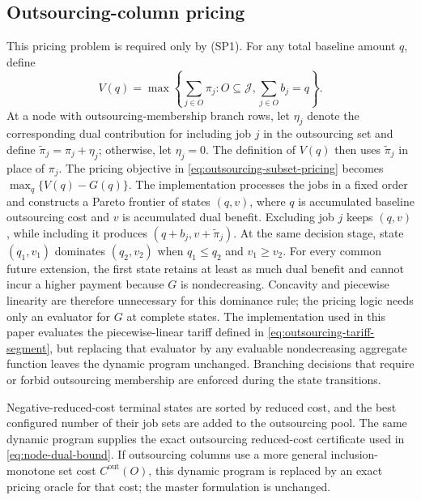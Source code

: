 \subsection{Outsourcing-column pricing}
\label{subsec:outsourcing-pricing}

This pricing problem is required only by \textup{(SP1)}. For any total
baseline amount $q$, define
\begin{equation}
    V(q)=
    \max\left\{
        \sum_{j\in O}\pi_j:
        O\subseteq\mathcal J,
        \sum_{j\in O}b_j=q
    \right\}.
\end{equation}
At a node with outsourcing-membership branch rows, let $\eta_j$ denote the
corresponding dual contribution for including job $j$ in the outsourcing set and
define $\widetilde\pi_j=\pi_j+\eta_j$; otherwise, let $\eta_j=0$. The definition of
$V(q)$ then uses $\widetilde\pi_j$ in place of $\pi_j$. The pricing objective in
\eqref{eq:outsourcing-subset-pricing} becomes
$\max_q\{V(q)-G(q)\}$. The implementation processes the jobs in a fixed order and
constructs a Pareto frontier of states $(q,v)$, where $q$ is accumulated baseline
outsourcing cost and $v$ is accumulated dual benefit. Excluding job $j$ keeps
$(q,v)$, while including it produces
$(q+b_j,v+\widetilde\pi_j)$. At the same decision stage, state $(q_1,v_1)$
dominates $(q_2,v_2)$ when $q_1\le q_2$ and $v_1\ge v_2$. For every common future
extension, the first state retains at least as much dual benefit and cannot incur a
higher payment because $G$ is nondecreasing. Concavity and piecewise linearity are
therefore unnecessary for this dominance rule; the pricing logic needs only an
evaluator for $G$ at complete states. The implementation used in this paper
evaluates the piecewise-linear tariff defined in
\eqref{eq:outsourcing-tariff-segment}, but replacing that evaluator by any
evaluable nondecreasing aggregate function leaves the dynamic program unchanged.
Branching decisions that require or forbid outsourcing membership are enforced
during the state transitions.

Negative-reduced-cost terminal states are sorted by reduced cost, and the best
configured number of their job sets are added to the outsourcing pool. The same
dynamic program supplies the exact outsourcing reduced-cost certificate used in
\eqref{eq:node-dual-bound}. If outsourcing columns use a more general
inclusion-monotone set cost $C^{\mathrm{out}}(O)$, this dynamic program is replaced
by an exact pricing oracle for that cost; the master formulation is unchanged.

